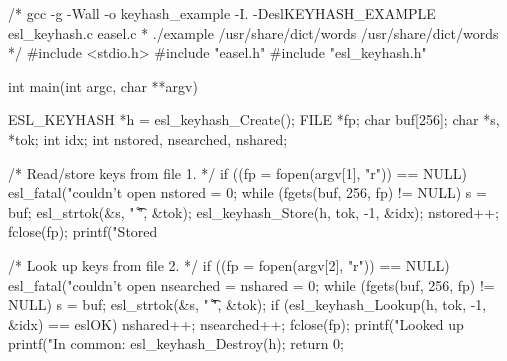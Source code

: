 \begin{cchunk}
/* gcc -g -Wall -o keyhash_example -I. -DeslKEYHASH_EXAMPLE esl_keyhash.c easel.c 
 * ./example /usr/share/dict/words /usr/share/dict/words
 */
#include <stdio.h>
#include "easel.h"
#include "esl_keyhash.h"

int
main(int argc, char **argv)
{
  ESL_KEYHASH *h   = esl_keyhash_Create();
  FILE        *fp;
  char         buf[256];
  char        *s, *tok;
  int          idx;
  int          nstored, nsearched, nshared;

  /* Read/store keys from file 1. */
  if ((fp = fopen(argv[1], "r")) == NULL) esl_fatal("couldn't open %
  nstored = 0;
  while (fgets(buf, 256, fp) != NULL)
    {
      s = buf;
      esl_strtok(&s, " \t\r\n", &tok);
      esl_keyhash_Store(h, tok, -1, &idx);
      nstored++;
    }
  fclose(fp);
  printf("Stored %

  /* Look up keys from file 2. */
  if ((fp = fopen(argv[2], "r")) == NULL) esl_fatal("couldn't open %
  nsearched = nshared = 0;
  while (fgets(buf, 256, fp) != NULL)
    {
      s = buf;
      esl_strtok(&s, " \t\r\n", &tok);
      if (esl_keyhash_Lookup(h, tok, -1, &idx) == eslOK) nshared++;
      nsearched++;
    }
  fclose(fp);
  printf("Looked up %
  printf("In common: %
  esl_keyhash_Destroy(h);
  return 0;
}
\end{cchunk}
